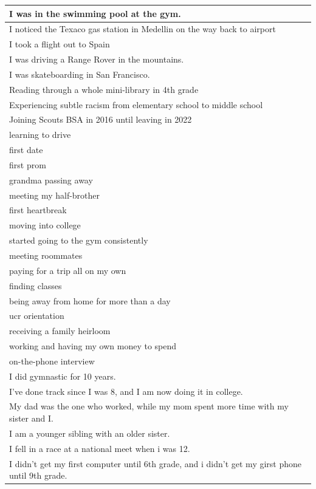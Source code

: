 \documentclass[
  .7em,
  letterpaper,
  DIV=11,
  numbers=noendperiod]{scrartcl}
\begin{document}
\begin{table}
\begin{tabular}{l}
\hline
I was in the swimming pool at the gym.\\
\hline
I noticed the Texaco gas station in Medellin on the way back to airport\\
\hline
I took a flight out to Spain\\
\hline
I was driving a Range Rover in the mountains.\\
\hline
I was skateboarding in San Francisco.\\
\hline
Reading through a whole mini-library in 4th grade\\
\hline
Experiencing subtle racism from elementary school to middle school\\
\hline
Joining Scouts BSA in 2016 until leaving in 2022\\
\hline
learning to drive\\
\hline
first date\\
\hline
first prom\\
\hline
grandma passing away\\
\hline
meeting my half-brother\\
\hline
first heartbreak\\
\hline
moving into college\\
\hline
started going to the gym consistently\\
\hline
meeting roommates\\
\hline
paying for a trip all on my own\\
\hline
finding classes\\
\hline
being away from home for more than a day\\
\hline
ucr orientation\\
\hline
receiving a family heirloom\\
\hline
working and having my own money to spend\\
\hline
on-the-phone interview\\
\hline
I did gymnastic for 10 years.\\
\hline
I've done track since I was 8, and I am now doing it in college.\\
\hline
My dad was the one who worked, while my mom spent more time with my sister and I.\\
\hline
I am a younger sibling with an older sister.\\
\hline
I fell in a race at a national meet when i was 12.\\
\hline
I didn't get my first computer until 6th grade, and i didn't get my girst phone until 9th grade.\\

\end{tabular}
\end{table}
\end{document}
